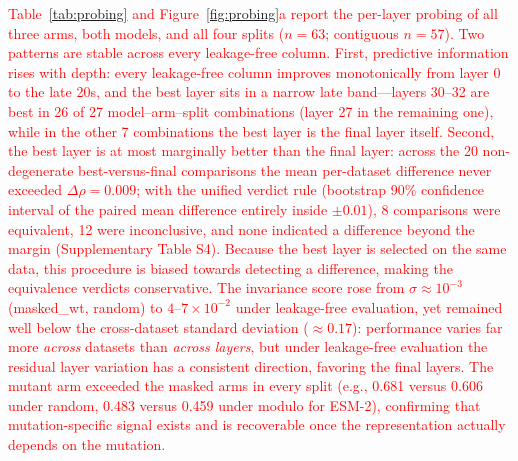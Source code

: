\documentclass[11pt,a4paper]{article}
\newcommand{\rev}[1]{\textcolor{red}{#1}}
\begin{document}
\textcolor{red}{\rev{Table~\ref{tab:probing} and Figure~\ref{fig:probing}a report the per-layer
probing of all three arms,
both models, and all four splits ($n = 63$; contiguous $n = 57$). Two patterns are
stable across every leakage-free column. First, predictive information rises
with depth: every leakage-free column improves monotonically from layer 0 to
the late 20s, and the best layer sits in a narrow late
band---layers 30--32 are best in 26 of 27 model--arm--split combinations (layer
27 in the remaining one), while in the other 7 combinations the best layer is
the final layer itself. Second, the best layer is at most marginally better than
the final layer: across the 20 non-degenerate best-versus-final comparisons the
mean per-dataset difference never exceeded $\Delta\rho = 0.009$; with the
unified verdict rule (bootstrap 90\% confidence interval of the paired mean
difference entirely inside $\pm 0.01$), 8 comparisons were equivalent, 12 were
inconclusive, and none indicated a difference beyond the margin (Supplementary
Table S4). Because the best layer is selected on the same data, this procedure
is biased towards detecting a difference, making the equivalence verdicts
conservative. The
invariance score rose from $\sigma \approx 10^{-3}$ (masked\_wt, random) to
$4$--$7 \times 10^{-2}$ under leakage-free evaluation, yet remained well below the
cross-dataset standard deviation ($\approx 0.17$): performance varies far more
\emph{across} datasets than \emph{across layers}, but under leakage-free evaluation
the residual layer variation has a consistent direction, favoring the final layers.
The mutant arm exceeded the masked arms in every split (e.g., 0.681 versus 0.606
under random, 0.483 versus 0.459 under modulo for ESM-2), confirming that
mutation-specific signal exists and is recoverable once the representation actually
depends on the mutation.}}
\end{document}

